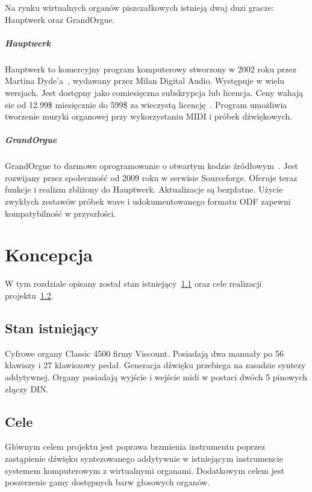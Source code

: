\documentclass[11pt]{report}
\begin{document}
    Na rynku wirtualnych organów piszczałkowych istnieją dwaj duzi gracze: Hauptwerk oraz GrandOrgue.

    \paragraph{Hauptwerk}
    Hauptwerk to komercyjny program komputerowy stworzony w 2002 roku przez Martina Dyde'a~\cite{13115512220180101}, wydawany przez Milan Digital Audio.
    Występuje w wielu wersjach.
    Jest dostępny jako comiesięczna subskrypcja lub licencja.
    Ceny wahają sie od 12.99\$ miesięcznie do 599\$ za wieczystą licencję~\cite{hauptwerk}.
    Program umożliwia tworzenie muzyki organowej przy wykorzystaniu MIDI i próbek dźwiękowych.

    \paragraph{GrandOrgue}
    GrandOrgue to darmowe oprogramowanie o otwartym kodzie źródłowym~\cite{grandorgue}.
    Jest rozwijany przez społeczność od 2009 roku w serwisie Sourceforge.
    Oferuje teraz funkcje i realizm zbliżony do Hauptwerk.
    Aktualizacje są bezpłatne.
    Użycie zwykłych zestawów próbek wave i udokumentowanego formatu ODF zapewni kompatybilność w przyszłości.


    \chapter{Koncepcja}
    W tym rozdziale opisany został stan istniejący~\ref{sec:stan-istniejący} oraz cele realizacji projektu~\ref{sec:cele}.


    \section{Stan istniejący}\label{sec:stan-istniejący}
    Cyfrowe organy Classic 4500 firmy Viscount.
    Posiadają dwa manuały po 56 klawiszy i 27 klawiszowy pedał.
    Generacja dźwięku przebiega na zasadzie syntezy addytywnej.
    Organy posiadają wyjście i wejście midi w postaci dwóch 5 pinowych złączy DIN.


    \section{Cele}\label{sec:cele}
    Głównym celem projektu jest poprawa brzmienia instrumentu poprzez zastąpienie dźwięku syntezowanego addytywnie
    w istniejącym instrumencie systemem komputerowym z wirtualnymi organami.
    Dodatkowym celem jest poszerzenie gamy dostępnych barw głosowych organów.
\end{document}
